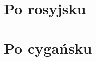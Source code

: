\documentclass[a4paper,draft]{book}
\begin{document}
\chapter{Po rosyjsku}
\begin{otherlanguage}{russian}
  
  
  
  
\end{otherlanguage}

\chapter{Po cygańsku}
\begin{otherlanguage}{czech}
  
  
\end{otherlanguage}
\end{document}
